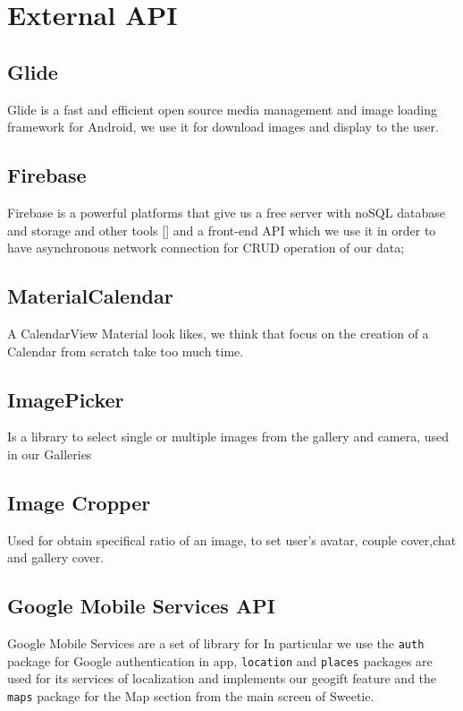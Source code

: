
\section{External API} 

\subsection{Glide}
Glide is a fast and efficient open source media management and image loading framework for Android, we use it for download images and display to the user.

\subsection{Firebase}
Firebase is a powerful platforms that give us a free server with noSQL database and storage and other tools [] and a front-end API which we use it in order to have asynchronous network connection for CRUD operation of our data;

\subsection{MaterialCalendar}
A CalendarView Material look likes, we think that focus on the creation of a Calendar from scratch take too much time.

\subsection{ImagePicker}
Is a library to select single or multiple images from the gallery and camera, used in our Galleries 

\subsection{Image Cropper}
Used for obtain specifical ratio of an image, to set user’s avatar, couple cover,chat and gallery cover.

\subsection{Google Mobile Services API}
Google Mobile Services are a set of library for In particular we use the \texttt{auth} package for Google authentication in app, \texttt{location} and \texttt{places} packages are used for its services of localization and implements our geogift feature and the \texttt{maps} package for the Map section from the main screen of Sweetie.